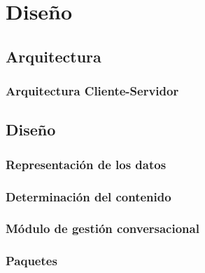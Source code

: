 \chapter{Diseño}

\section{Arquitectura}
\subsection{Arquitectura Cliente-Servidor}

\section{Diseño}
\subsection{Representación de los datos}
\subsection{Determinación del contenido}
\subsection{Módulo de gestión conversacional}
\subsection{Paquetes}